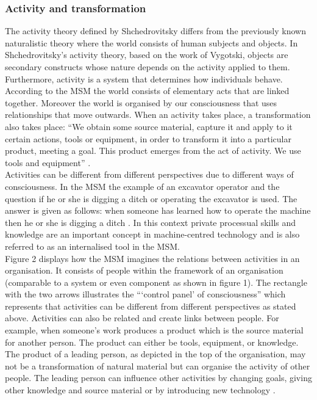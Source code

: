 \documentclass[11pt,a4paper]{article}
\begin{document}
\subsubsection{Activity and transformation}
The activity theory defined by Shchedrovitsky differs from the previously known naturalistic theory where the world consists of human subjects and objects. In Shchedrovitsky’s activity theory, based on the work of Vygotski, objects are secondary constructs whose nature depends on the activity applied to them. Furthermore, activity is a system that determines how individuals behave. \\
According to the MSM the world consists of elementary acts that are linked together. Moreover the world is organised by our consciousness that uses relationships that move outwards. When an activity takes place, a transformation also takes place: “We obtain some source material, capture it and apply to it certain actions, tools or equipment, in order to transform it into a particular product, meeting a goal. This product emerges from the act of activity. We use tools and equipment” \cite[p. 38]{MSM}. \\
Activities can be different from different perspectives due to different ways of consciousness. In the MSM the example of an excavator operator and the question if he or she is digging a ditch or operating the excavator is used. The answer is given as follows: when someone has learned how to operate the machine then he or she is digging a ditch \cite[p. 38f.]{MSM}. In this context private processual skills and knowledge are an important concept in machine-centred technology \cite[p. 6ff.]{GraebeTechnology} and is also referred to as an internalised tool in the MSM. \\
Figure 2 displays how the MSM imagines the relations between activities in an organisation. It consists of people within the framework of an organisation (comparable to a system or even component as shown in figure 1). The rectangle with the two arrows illustrates the “‘control panel’ of consciousness” \cite[p. 38ff.]{MSM} which represents that activities can be different from different perspectives as stated above. Activities can also be related and create links between people. For example, when someone’s work produces a product which is the source material for another person. The product can either be tools, equipment, or knowledge. The product of a leading person, as depicted in the top of the organisation, may not be a transformation of natural material but can organise the activity of other people. The leading person can influence other activities by changing goals, giving other knowledge and source material or by introducing new technology \cite[p. 38ff.]{MSM}. \\
\end{document}
